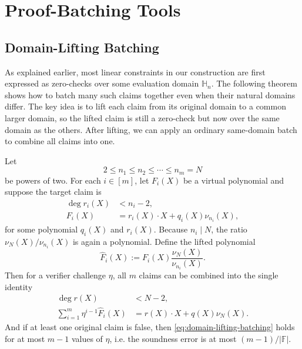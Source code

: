 \section{Proof-Batching Tools}\label{sec:tools}


\subsection{Domain-Lifting Batching}

As explained earlier, most linear constraints in our construction are first
expressed as zero-checks over some evaluation domain $\mathbb{H}_n$. The
following theorem shows how to batch many such claims together even when their
natural domains differ. The key idea is to lift each claim from its original
domain to a common larger domain, so the lifted claim is still a zero-check
but now over the same domain as the others. After lifting, we can apply an
ordinary same-domain batch to combine all claims into one.

\begin{theorem}
\label{thm:domain-lifting-batching}
Let
\[
2 \leq n_1 \leq n_2 \leq \cdots \leq n_m = N
\]
be powers of two. For each $i \in [m]$, let $F_i(X)$ be a virtual polynomial
and suppose the target claim is
\begin{align}
\deg r_i(X) &< n_i-2,\\
F_i(X) &= r_i(X)\cdot X + q_i(X)\nu_{n_i}(X),
\end{align}
for some polynomial $q_i(X)$ and $r_i(X)$.
Because $n_i \mid N$, the ratio $\nu_N(X)/\nu_{n_i}(X)$ is again a polynomial.
Define the lifted polynomial
\[
\widehat{F}_i(X):=
F_i(X)\frac{\nu_N(X)}{\nu_{n_i}(X)}.
\]
Then for a verifier challenge $\eta$, all $m$ claims can be combined into
  the single identity
  \begin{align}\label{eq:domain-lifting-batching}
    \deg r(X) &< N-2,\\
    \sum_{i=1}^{m}\eta^{i-1}\widehat{F}_i(X) &= r(X)\cdot X + q(X)\nu_N(X).
  \end{align}
  And if at least one original claim is false, then
  \eqref{eq:domain-lifting-batching} holds for at most $m-1$ values of $\eta$, i.e. the soundness error is at most $(m-1)/|\mathbb{F}|$.
\end{theorem}

